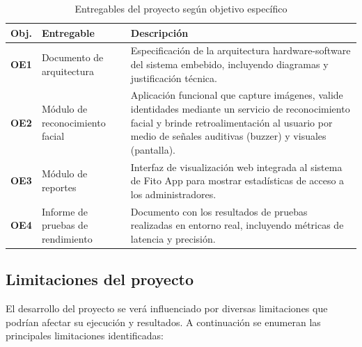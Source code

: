 \begin{table}[h!]
    \centering
    \begin{tabular}{p{1.5cm}|p{4.5cm}|p{8cm}}
        \hline
        \textbf{Obj.} & \textbf{Entregable} & \textbf{Descripción} \\ \hline
        \textbf{OE1} & Documento de arquitectura & Especificación de la arquitectura hardware-software del sistema embebido, incluyendo diagramas y justificación técnica. \\ \hline
        \textbf{OE2} & Módulo de reconocimiento facial & Aplicación funcional que capture imágenes, valide identidades mediante un servicio de reconocimiento facial y brinde retroalimentación al usuario por medio de señales auditivas (buzzer) y visuales (pantalla). \\ \hline
        \textbf{OE3} & Módulo de reportes & Interfaz de visualización web integrada al sistema de Fito App para mostrar estadísticas de acceso a los administradores. \\ \hline
        \textbf{OE4} & Informe de pruebas de rendimiento & Documento con los resultados de pruebas realizadas en entorno real, incluyendo métricas de latencia y precisión. \\ \hline
    \end{tabular}
    \caption{Entregables del proyecto según objetivo específico}
    \label{tab:deliverables}
\end{table}


\subsection{Limitaciones del proyecto}
El desarrollo del proyecto se verá influenciado por diversas limitaciones que podrían afectar su ejecución y resultados. A continuación se enumeran las principales limitaciones identificadas:

